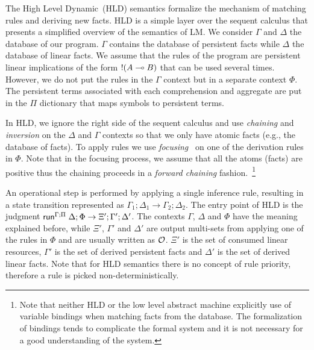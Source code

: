 The High Level Dynamic~(HLD) semantics formalize the mechanism of matching rules
and deriving new facts. HLD is a simple layer over the sequent calculus that
presents a simplified overview of the semantics of LM. We consider $\Gamma$ and
$\Delta$ the database of our program. $\Gamma$ contains the database of
persistent facts while $\Delta$ the database of linear facts. We assume that the
rules of the program are persistent linear implications of the form ${!} (A
\multimap B)$ that can be used several times. However, we do not put the rules in
the $\Gamma$ context but in a separate context $\Phi$. The persistent terms
associated with each comprehension and aggregate are put in the $\Pi$ dictionary
that maps symbols to persistent terms.

In HLD, we ignore the right side of the sequent calculus and use \emph{chaining}
and \emph{inversion} on the $\Delta$ and $\Gamma$ contexts so that we only have
atomic facts (e.g., the database of facts). To apply rules we use
\emph{focusing}~\cite{Andreoli92logicprogramming} on one of the derivation rules
in $\Phi$. Note that in the focusing process, we assume that all the atoms
(facts) are positive thus the chaining proceeds in a \emph{forward chaining}
fashion.~\footnote{Note that neither HLD or the low level abstract machine
   explicitly use of variable bindings when matching facts from the database. The
   formalization of bindings tends to complicate the formal system and it is not
   necessary for a good understanding of the system.}

An operational step is performed by applying a single inference rule, resulting
in a state transition represented as $\Gamma_1; \Delta_1 \rightarrow \Gamma_2;
\Delta_2$. The entry point of HLD is the judgment
$\mathsf{run}^{\Gamma ; \Pi} \; \Delta ; \Phi \rightarrow \Xi' ; \Gamma'; \Delta'$. The contexts
$\Gamma$, $\Delta$ and $\Phi$ have the meaning explained before, while $\Xi'$,
$\Gamma'$ and $\Delta'$ are output multi-sets from applying one of the rules in
$\Phi$ and are usually written as $\mathcal{O}$. $\Xi'$ is the set of consumed
linear resources, $\Gamma'$ is the set of derived persistent facts and $\Delta'$
is the set of derived linear facts.  Note that for HLD semantics there is no
concept of rule priority, therefore a rule is picked non-deterministically.

